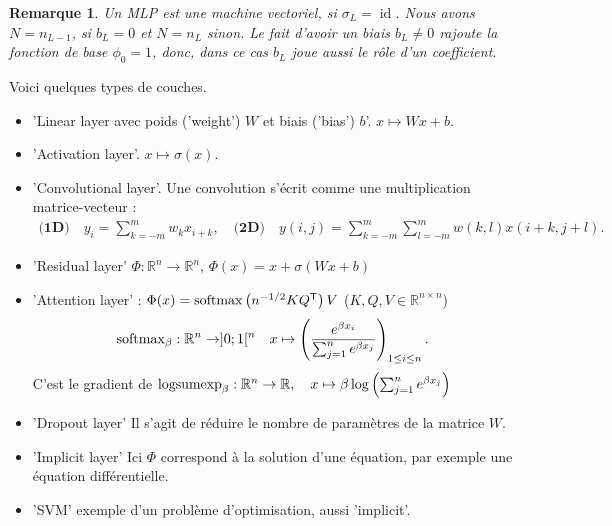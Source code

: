 \documentclass[11pt,a4paper, french]{article}
\newcommand{\R}{\mathbb R}
\newcommand{\transpose}[1]{{#1}^{\mathsf{T}}}
\newcommand{\id}{\operatorname{id}}
\newtheorem{remark}[theorem]{Remarque}
\begin{document}
%
%
\begin{remark}\label{remark:}
Un MLP est une machine vectoriel, si $\sigma_L=\id$. Nous avons $N=n_{L-1}$, si $b_L=0$ et  $N=n_{L}$ sinon.
Le fait d'avoir un biais $b_L\ne0$ rajoute la fonction de base $\phi_0=1$, donc, dans ce cas $b_L$ joue aussi le rôle d'un coefficient.
\end{remark}
%
Voici quelques types de couches.
%
\begin{itemize}
\item 'Linear layer avec poids ('weight') $W$ et biais ('bias') $b$'. $x \mapsto W x + b$.
\item 'Activation layer'. $x \mapsto \sigma(x)$.
\item 'Convolutional layer'. Une convolution s'écrit comme une multiplication matrice-vecteur :
\begin{align*}
\textbf{(1D)}\quad y_i = \sum_{k=-m}^m w_k x_{i+k},\quad \textbf{(2D)}\quad y(i,j) = \sum_{k=-m}^m\sum_{l=-m}^m w(k,l) x(i+k, j+l).
\end{align*}

\item 'Residual layer' $\Phi:\R^n\to\R^n$, $\Phi(x) = x +\sigma(W x + b)$
\item 'Attention layer' : $\Phi(x) = {\rm softmax}\left(n^{-1/2} K \transpose{Q}\right)V$ ($K,Q,V\in\R^{n\times n}$)
\begin{align*}
{\rm softmax}_{\beta}: \R^n\to]0;1[^n\quad x\mapsto \left(\frac{e^{\beta x_i}}{\sum_{j=1}^n e^{\beta x_j}}\right)_{1\le i\le n}.
\end{align*}
C'est le gradient de  ${\rm logsumexp}_{\beta}: \R^n\to\R,\quad x\mapsto \beta\log\left(\sum_{j=1}^n e^{\beta x_j}\right)$
\item 'Dropout layer' Il s'agit de réduire le nombre de paramètres de la matrice $W$.
\item 'Implicit layer' Ici $\Phi$ correspond à la solution d'une équation, par exemple une équation différentielle.
\item 'SVM' exemple d'un problème d'optimisation, aussi 'implicit'.
\end{itemize}
%
%
\end{document}
